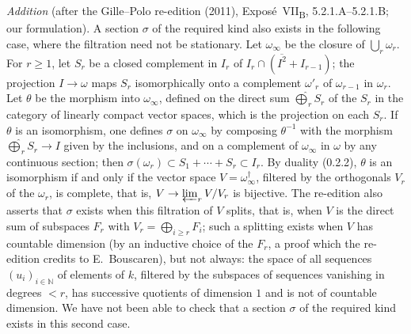 \medskip
\noindent\emph{Addition} (after the Gille--Polo re-edition (2011),
Expos\'e~VII\textsubscript{B}, 5.2.1.A--5.2.1.B; our formulation). A
section \(\sigma\) of the required kind also exists in the following
case, where the filtration need not be stationary. Let
\(\omega_\infty\) be the closure of \(\bigcup_r\omega_r\). For
\(r\geq1\), let \(S_r\) be a closed complement in \(I_r\) of
\(I_r\cap(\overline{I^2}+I_{r-1})\); the projection \(I\to\omega\) maps
\(S_r\) isomorphically onto a complement \(\omega'_r\) of
\(\omega_{r-1}\) in \(\omega_r\). Let \(\theta\) be the morphism into
\(\omega_\infty\), defined on the direct sum \(\widehat\bigoplus_rS_r\)
of the \(S_r\) in the category of linearly compact vector spaces, which
is the projection on each \(S_r\). If \(\theta\) is an isomorphism, one
defines \(\sigma\) on \(\omega_\infty\) by composing \(\theta^{-1}\) with
the morphism \(\widehat\bigoplus_rS_r\to I\) given by the inclusions,
and on a complement of \(\omega_\infty\) in \(\omega\) by any continuous
section; then \(\sigma(\omega_r)\subset S_1+\cdots+S_r\subset I_r\). By
duality \textup{(0.2.2)}, \(\theta\) is an isomorphism if and only if the
vector space \(V=\omega_\infty^\dagger\), filtered by the orthogonals
\(V_r\) of the \(\omega_r\), is complete, that is,
\(V\to\varprojlim_rV/V_r\) is bijective. The re-edition also asserts
that \(\sigma\) exists when this filtration of \(V\) splits, that is,
when \(V\) is the direct sum of subspaces \(F_r\) with
\(V_r=\bigoplus_{i\geq r}F_i\); such a splitting exists when \(V\) has
countable dimension (by an inductive choice of the \(F_r\), a proof
which the re-edition credits to E.~Bouscaren), but not always: the space
of all sequences \((u_i)_{i\in\mathbb N}\) of elements of \(k\),
filtered by the subspaces of sequences vanishing in degrees \(<r\), has
successive quotients of dimension \(1\) and is not of countable
dimension. We have not been able to check that a section \(\sigma\) of
the required kind exists in this second case.
